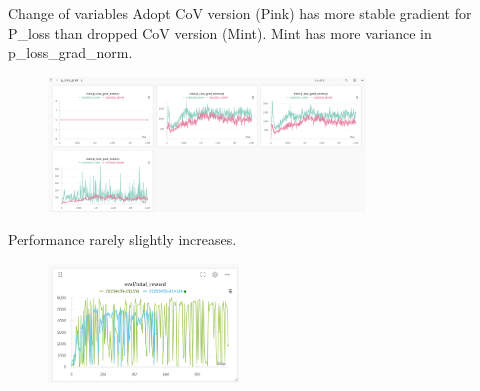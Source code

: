 \documentclass[8pt]{beamer}
\begin{document}
\begin{frame}{Change of variables}
    Adopt CoV version (Pink) has more stable gradient for P\_loss than dropped CoV version (Mint). Mint has more variance in p\_loss\_grad\_norm.
    \begin{figure}
        \includegraphics[width=0.75\textwidth]{MoreStablePLoss.png}
    \end{figure}

    Performance rarely slightly increases.
    \begin{figure}
        \includegraphics[width=0.45\textwidth]{CoVReturns.png}
    \end{figure}
\end{frame}
\end{document}
